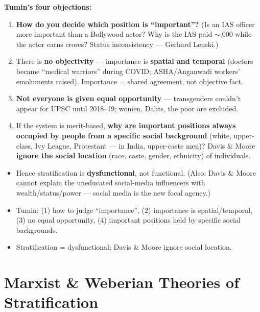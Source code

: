 \begin{CriticalPoint}
\textbf{Tumin's four objections:}
\begin{enumerate}
\item \textbf{How do you decide which position is ``important''?} (Is an IAS officer more important than a Bollywood actor? Why is the IAS paid $\sim$,000 while the actor earns crores? Status inconsistency --- Gerhard Lenski.)
\item There is \textbf{no objectivity} --- importance is \textbf{spatial and temporal} (doctors became ``medical warriors'' during COVID; ASHA/Anganwadi workers' emoluments raised). Importance = shared agreement, not objective fact.
\item \textbf{Not everyone is given equal opportunity} --- transgenders couldn't appear for UPSC until 2018--19; women, Dalits, the poor are excluded.
\item If the system is merit-based, \textbf{why are important positions always occupied by people from a specific social background} (white, upper-class, Ivy League, Protestant --- in India, upper-caste men)? Davis \& Moore \textbf{ignore the social location} (race, caste, gender, ethnicity) of individuals.
\end{enumerate}
\begin{itemize}
\item Hence stratification is \textbf{dysfunctional}, not functional. (Also: Davis \& Moore cannot explain the uneducated social-media influencers with wealth/status/power --- social media is the new focal agency.)
\end{itemize}
\end{CriticalPoint}

\begin{QuickRevision}
\begin{itemize}
\item Tumin: (1) how to judge ``importance'', (2) importance is spatial/temporal, (3) no equal opportunity, (4) important positions held by specific social backgrounds.
\item Stratification = dysfunctional; Davis \& Moore ignore social location.
\end{itemize}
\end{QuickRevision}

\sectiondivider

\section{Marxist \& Weberian Theories of Stratification}

